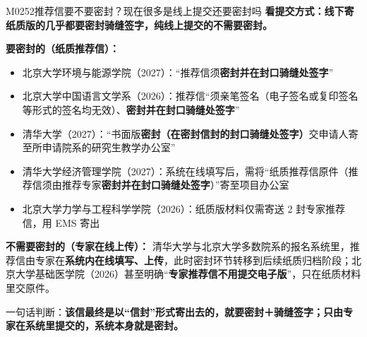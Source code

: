 \begin{qa}{M0252}{推荐信要不要密封？现在很多是线上提交还要密封吗}
\textbf{看提交方式：线下寄纸质版的几乎都要密封骑缝签字，纯线上提交的不需要密封。}

\textbf{要密封的（纸质推荐信）：}

\begin{itemize}
  \item 北京大学环境与能源学院（2027）：“推荐信须\textbf{密封并在封口骑缝处签字}”
  \item 北京大学中国语言文学系（2026）：推荐信“须亲笔签名（电子签名或复印签名等形式的签名均无效）、\textbf{密封并在封口骑缝处签字}”
  \item 清华大学（2027）：“书面版\textbf{密封（在密封信封的封口骑缝处签字）}交申请人寄至所申请院系的研究生教学办公室”
  \item 清华大学经济管理学院（2027）：系统在线填写后，需将“纸质推荐信原件（推荐信须由推荐专家\textbf{密封并在封口骑缝处签字}）”寄至项目办公室
  \item 北京大学力学与工程科学学院（2026）：纸质版材料仅需寄送 2 封专家推荐信，用 EMS 寄出
\end{itemize}

\textbf{不需要密封的（专家在线上传）：} 清华大学与北京大学多数院系的报名系统里，推荐信由专家在\textbf{系统内在线填写、上传}，此时密封环节转移到后续纸质归档阶段；北京大学基础医学院（2026）甚至明确“\textbf{专家推荐信不用提交电子版}”，只在纸质材料里交原件。

一句话判断：\textbf{该信最终是以“信封”形式寄出去的，就要密封＋骑缝签字；只由专家在系统里提交的，系统本身就是密封。}
\end{qa}

